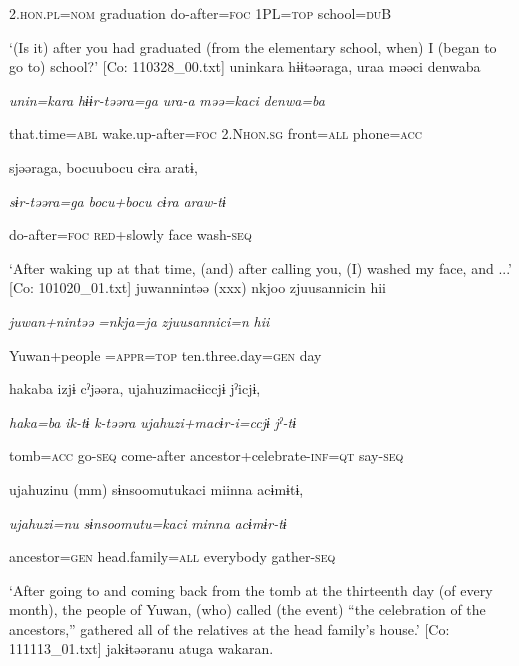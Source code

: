       2.\textsc{hon}.\textsc{pl}=\textsc{nom}  graduation  do-after=\textsc{foc}  1PL=\textsc{top}  school=\textsc{du}B

\glt ‘(Is it) after you had graduated (from the elementary school, when) I (began to go to) school?’ [Co: 110328\_00.txt]
\ex {\TM}
\glll  uninkara  hɨɨtəəraga,  uraa  məəci  {\textbar}denwa{\textbar}ba

      \textit{unin=kara}  \textit{hɨɨr-təəra=ga}  \textit{ura-a}  \textit{məə=kaci}  \textit{denwa=ba}

      that.time=\textsc{abl}  wake.up-after=\textsc{foc}  2.N\textsc{hon}.\textsc{sg}  front=\textsc{all}  phone=\textsc{acc}

      sjəəraga,  bocuubocu  cɨra  aratɨ,

      \textit{sɨr-təəra=ga}  \textit{bocu+bocu}  \textit{cɨra}  \textit{araw-tɨ}

      do-after=\textsc{foc}  \textsc{red}+slowly  face  wash-\textsc{seq}

\glt ‘After waking up at that time, (and) after calling you, (I) washed my face, and ...’ [Co: 101020\_01.txt]
\ex {\TM}
\glll  juwannintəə  (xxx)  nkjoo  {\textbar}zjuusannici{\textbar}n  hii

      \textit{juwan+nintəə}    \textit{=nkja=ja}  \textit{zjuusannici=n}  \textit{hii}

      Yuwan+people    =\textsc{appr}=\textsc{top}  ten.three.day=\textsc{gen}  day

      hakaba  izjɨ  cˀjəəra,  ujahuzimacɨiccjɨ  jˀicjɨ,

      \textit{haka=ba}  \textit{ik-tɨ}  \textit{k-təəra}  \textit{ujahuzi+macɨr-i=ccjɨ}  \textit{jˀ-tɨ}

      tomb=\textsc{acc}  go-\textsc{seq}  come-after  ancestor+celebrate-\textsc{inf}=\textsc{qt}  say-\textsc{seq}

      ujahuzinu  (mm)  sɨnsoomutukaci  miinna  acɨmɨtɨ,

      \textit{ujahuzi=nu}    \textit{sɨnsoomutu=kaci}  \textit{minna}  \textit{acɨmɨr-tɨ}

      ancestor=\textsc{gen}    head.family=\textsc{all}  everybody  gather-\textsc{seq}

\glt ‘After going to and coming back from the tomb at the thirteenth day (of every month), the people of Yuwan, (who) called (the event) “the celebration of the ancestors,” gathered all of the relatives at the head family’s house.’ [Co: 111113\_01.txt]
\ex {\TM}
\glll  jakɨtəəranu  atuga  wakaran.

